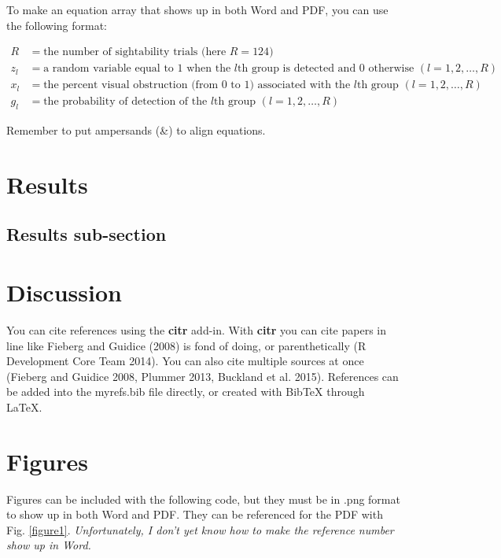 \documentclass[]{article}
\begin{document}
To make an equation array that shows up in both Word and PDF, you can
use the following format:

\[
\begin{aligned}
R  &=  \text{the number of sightability trials (here }R = 124)\\
z_l &= \text{a random variable equal to 1 when the }l\text{th group is detected and 0 otherwise } (l = 1,2, \ldots, R)\\
x_l &= \text{the percent visual obstruction (from 0 to 1) associated with the }l\text{th group } (l = 1,2, \ldots, R)\\
g_l &= \text{the probability of detection of the }l\text{th group } (l = 1,2, \ldots, R)
\end{aligned}
\]

Remember to put ampersands (\&) to align equations.

\section{Results}\label{results}

\subsection{Results sub-section}\label{results-sub-section}

\section{Discussion}\label{discussion}

You can cite references using the \textbf{citr} add-in. With
\textbf{citr} you can cite papers in line like Fieberg and Guidice
(2008) is fond of doing, or parenthetically (R Development Core Team
2014). You can also cite multiple sources at once (Fieberg and Guidice
2008, Plummer 2013, Buckland et al. 2015). References can be added into
the myrefs.bib file directly, or created with BibTeX through LaTeX.

\section{Figures}\label{figures}

Figures can be included with the following code, but they must be in
.png format to show up in both Word and PDF. They can be referenced for
the PDF with Fig. \ref{figure1}. \emph{Unfortunately, I don't yet know
how to make the reference number show up in Word.}
\end{document}
